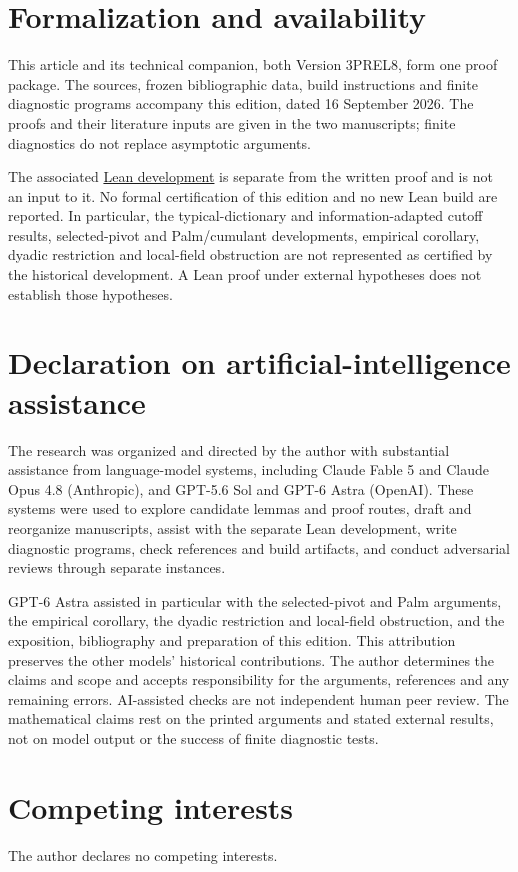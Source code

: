 \section*{Formalization and availability}
This article and its technical companion, both Version 3PREL8, form one
proof package. The sources, frozen bibliographic data, build instructions
and finite diagnostic programs accompany this edition, dated
16 September 2026. The proofs and their literature inputs are given in
the two manuscripts; finite diagnostics do not replace asymptotic arguments.

The associated \href{https://github.com/Vulkin-prog/paper-c-lean}{Lean development}
is separate from the written proof and is not an input to it.
No formal certification of this edition and no new Lean build are
reported. In particular, the typical-dictionary and information-adapted
cutoff results, selected-pivot and Palm/cumulant developments, empirical
corollary, dyadic restriction and local-field obstruction are not
represented as certified by the historical development. A Lean proof
under external hypotheses does not establish those hypotheses.

\section*{Declaration on artificial-intelligence assistance}
\label{sec:ai-assistance}
The research was organized and directed by the author with substantial
assistance from language-model systems, including Claude Fable 5 and
Claude Opus 4.8 (Anthropic), and GPT-5.6 Sol and GPT-6 Astra (OpenAI).
These systems were used to explore candidate lemmas and proof routes,
draft and reorganize manuscripts, assist with the separate Lean development,
write diagnostic programs, check references and build artifacts, and
conduct adversarial reviews through separate instances.

GPT-6 Astra assisted in particular with the selected-pivot and Palm
arguments, the empirical corollary, the dyadic restriction and local-field
obstruction, and the exposition, bibliography and preparation of this
edition. This attribution preserves the other models' historical
contributions. The author determines the claims and scope and accepts
responsibility for the arguments, references and any remaining errors.
AI-assisted checks are not independent human peer review. The
mathematical claims rest on the printed arguments and stated external
results, not on model output or the success of finite diagnostic tests.

\section*{Competing interests}
The author declares no competing interests.
